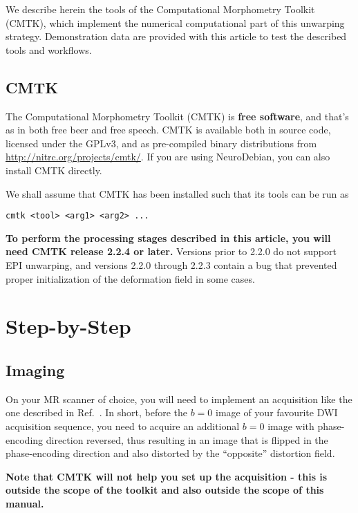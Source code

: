 \documentclass{InsightArticle}
\begin{document}
We describe herein the tools of the Computational Morphometry Toolkit (CMTK),
which implement the numerical computational part of this unwarping
strategy. Demonstration data are provided with this article to test the
described tools and workflows.

\subsection{CMTK}

The Computational Morphometry Toolkit (CMTK) is {\bf free software}, and
that's as in both free beer and free speech. CMTK is available both in source
code, licensed under the GPLv3, and as pre-compiled binary distributions from
\url{http://nitrc.org/projects/cmtk/}. If you are using NeuroDebian, you can
also install CMTK directly.

We shall assume that CMTK has been installed such that its tools can be run as
\begin{verbatim}
cmtk <tool> <arg1> <arg2> ...
\end{verbatim}

{\bf To perform the processing stages described in this article, you will need
CMTK release 2.2.4 or later.} Versions prior to 2.2.0 do not support EPI
unwarping, and versions 2.2.0 through 2.2.3 contain a bug that prevented
proper initialization of the deformation field in some cases.

\section{Step-by-Step}

\subsection{Imaging}

On your MR scanner of choice, you will need to implement an acquisition like
the one described in Ref.~\cite{HollKupeDale:2010}. In short, before the $b=0$
image of your favourite DWI acquisition sequence, you need to acquire an
additional $b=0$ image with phase-encoding direction reversed, thus resulting
in an image that is flipped in the phase-encoding direction and also distorted
by the ``opposite'' distortion field. 

{\bf Note that CMTK will not help you set up the acquisition - this is outside
the scope of the toolkit and also outside the scope of this manual.}
\end{document}
